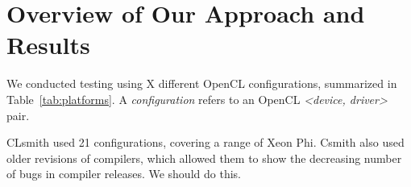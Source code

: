 \section{Overview of Our Approach and Results}\label{sec:overview}

We conducted testing using X different OpenCL configurations, summarized in Table~\ref{tab:platforms}. A \emph{configuration} refers to an OpenCL \emph{<device, driver>} pair.



CLsmith used 21 configurations, covering a range of Xeon Phi. Csmith also used older revisions of compilers, which allowed them to show the decreasing number of bugs in compiler releases. We should do this.